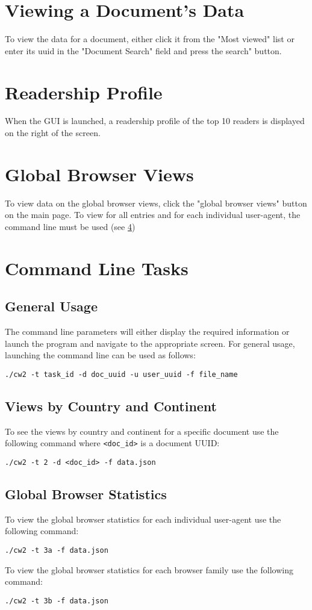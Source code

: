 \documentclass[11pt]{report}
\begin{document}
\section{Viewing a Document's Data}
To view the data for a document, either click it from the "Most viewed" list or enter its uuid in the "Document Search" field and press the search" button.
\section{Readership Profile}
When the GUI is launched, a readership profile of the top 10 readers is displayed on the right of the screen.
\section{Global Browser Views}
To view data on the global browser views, click the "global browser views" button on the main page.  To view for all entries and for each individual user-agent, the command line must be used (see \ref{usercommand})
\section{Command Line Tasks}\label{usercommand} %
\subsection{General Usage}
The command line parameters will either display the required information or launch the program and navigate to the appropriate screen.  For general usage, launching the command line can be used as follows:
\begin{lstlisting}
./cw2 -t task_id -d doc_uuid -u user_uuid -f file_name
\end{lstlisting}
\subsection{Views by Country and Continent}
To see the views by country and continent for a specific document use the following command where \lstinline{<doc_id>} is a document UUID:
\begin{lstlisting}
./cw2 -t 2 -d <doc_id> -f data.json
\end{lstlisting}
\subsection{Global Browser Statistics}
To view the global browser statistics for each individual user-agent use the following command:
\begin{lstlisting}
./cw2 -t 3a -f data.json
\end{lstlisting}
To view the global browser statistics for each browser family use the following command:
\begin{lstlisting}
./cw2 -t 3b -f data.json
\end{lstlisting}
\end{document}

